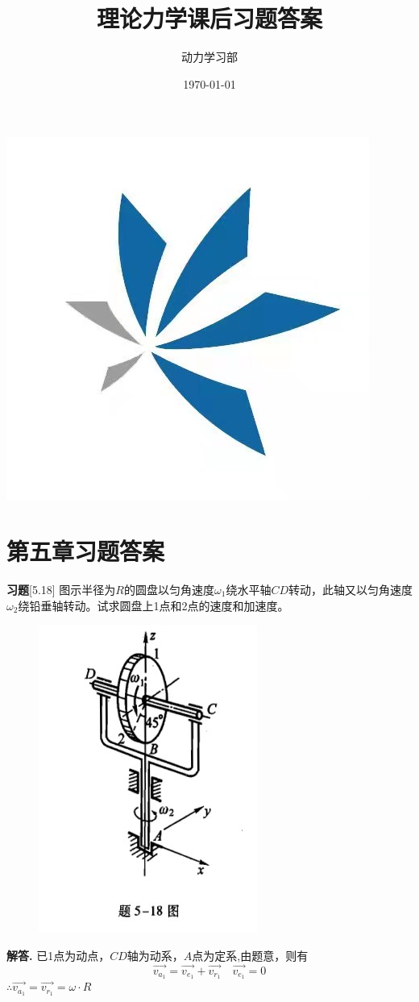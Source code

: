 \documentclass[12pt, a4paper]{ctexart}
\newenvironment{problem}{\par\noindent\textbf{习题}}{\par}
\newenvironment{solution}{\par\noindent\textbf{解答. }}{\par}
\begin{document}
\title{\textbf{理论力学课后习题答案}}
\author{动力学习部}
\date{\today}
\maketitle
\includegraphics[scale=0.8]{2.jpg}
\newpage
{}
\tableofcontents
\newpage
{}
\section{第五章习题答案}
\begin{problem}[5.18]
图示半径为$R$的圆盘以匀角速度$\omega_1$绕水平轴$ CD $转动，此轴又以匀角速度$\omega_2 $绕铅垂轴转动。试求圆盘上1点和2点的速度和加速度。
\end{problem}

\begin{figure}[ht]
	\centering
	\includegraphics[scale=0.7]{3.jpg}
\end{figure}

\begin{solution}
	已1点为动点，$CD$轴为动系，$A$点为定系,由题意，则有
	\[
		\vec{v_{a_{1}}}=\vec{v_{e_1}}+\vec{v_{r_1}} \quad \vec{v_{e_1}}=0
	\]
	$\therefore \vec{v_{a_1}}=\vec{v_{r_1}}=\omega \cdot R$  
\end{solution}
\end{document}
